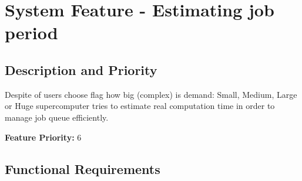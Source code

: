 \documentclass{scrreprt}
\begin{document}
\section{System Feature - Estimating job period }

\subsection{Description and Priority}
Despite of users choose flag how big (complex) is demand: Small, Medium, Large or Huge supercomputer tries to estimate real computation time in order to manage job queue efficiently.  

\textbf{Feature Priority: } 6

\subsection{Functional Requirements}
\end{document}
